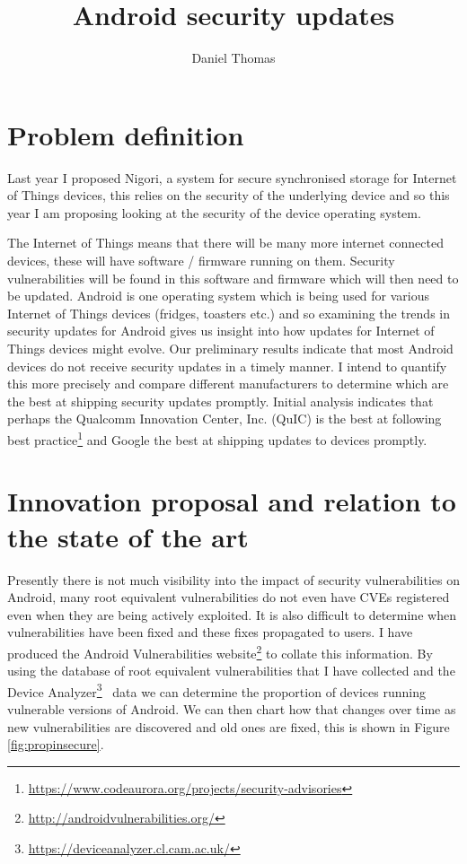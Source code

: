 \documentclass[a4paper,twocolumn]{article}
\author{Daniel Thomas}
\title{Android security updates}
\date{}%
\begin{document}
\maketitle

\section*{Problem definition}
Last year I proposed Nigori, a system for secure synchronised storage for Internet of Things devices, this relies on the security of the underlying device and so this year I am proposing looking at the security of the device operating system.

The Internet of Things means that there will be many more internet connected devices, these will have software / firmware running on them.
Security vulnerabilities will be found in this software and firmware which will then need to be updated.
Android is one operating system which is being used for various Internet of Things devices (fridges, toasters etc.) and so examining the trends in security updates for Android gives us insight into how updates for Internet of Things devices might evolve.
Our preliminary results indicate that most Android devices do not receive security updates in a timely manner.
I intend to quantify this more precisely and compare different manufacturers to determine which are the best at shipping security updates promptly.
Initial analysis indicates that perhaps the Qualcomm Innovation Center, Inc. (QuIC) is the best at following best practice\footnote{\url{https://www.codeaurora.org/projects/security-advisories}} and Google the best at shipping updates to devices promptly.


\section*{Innovation proposal and relation to the state of the art}
Presently there is not much visibility into the impact of security vulnerabilities on Android, many root equivalent vulnerabilities do not even have CVEs registered even when they are being actively exploited.
It is also difficult to determine when vulnerabilities have been fixed and these fixes propagated to users.
I have produced the Android Vulnerabilities website\footnote{\url{http://androidvulnerabilities.org/}} to collate this information.
By using the database of root equivalent vulnerabilities that I have collected and the Device Analyzer\footnote{\url{https://deviceanalyzer.cl.cam.ac.uk/}}~\cite{TODO} data we can determine the proportion of devices running vulnerable versions of Android.
We can then chart how that changes over time as new vulnerabilities are discovered and old ones are fixed, this is shown in Figure \ref{fig:propinsecure}.
\end{document}
